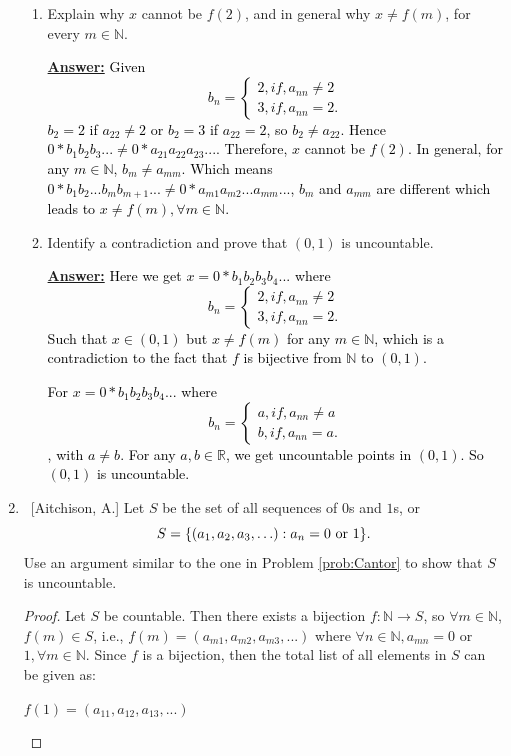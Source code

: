 \documentclass[10pt]{article}
\begin{document}
\begin{enumerate}
\begin{enumerate}
	\item  Explain why $x$ cannot be $f(2)$, and in general why $x \neq f(m)$, for every $m \in \mathbb{N}$.
 
	\textbf{\underline{Answer:}}
 \textcolor{black}{Given
 \begin{equation}
  b_n=%
  \begin{cases}
    2, if,  a_{nn} \neq 2 \\
    3, if,  a_{nn}=2.
  \end{cases}
\end{equation}
$b_2 = 2$ if $a_{22} \neq 2$ or $b_2 = 3$ if $a_{22} = 2$, so $b_2 \neq a_{22}$.  Hence $0*b_1b_2b_3... \neq 0*a_{21}a_{22}a_{23}...$.  Therefore, $x$ cannot be $f(2)$.  In general, for any $m \in \mathbb{N}$, $b_m \neq a_{mm}$.  Which means $0*b_1b_2...b_mb_{m+1}... \neq 0*a_{m1}a_{m2}...a_{mm}...$, $b_m$ and $a_{mm}$ are different which leads to $x \neq f(m), \forall m \in \mathbb{N}$.
}
 
	\item  Identify a contradiction and prove that $(0,1)$ is uncountable.
 
	\textbf{\underline{Answer:}}
 \textcolor{black}{Here we get $x = 0*b_1b_2b_3b_4...$ where 
 \begin{equation}
  b_n=%
  \begin{cases}
    2, if,  a_{nn} \neq 2 \\
    3, if,  a_{nn}=2.
  \end{cases}
\end{equation}
Such that $x \in (0,1)$ but $x \neq f(m)$ for any $m \in \mathbb{N}$, which is a contradiction to the fact that $f$ is bijective from $\mathbb{N}$ to $(0,1)$.
}

\textcolor{black}{For $x = 0*b_1b_2b_3b_4...$ where 
 \begin{equation}
  b_n=%
  \begin{cases}
    a, if,  a_{nn} \neq a \\
    b, if,  a_{nn}=a.
  \end{cases}
\end{equation}
, with $a \neq b$.  For any $a,b \in \mathbb{R}$, we get uncountable points in $(0,1)$.  So $(0,1)$ is uncountable.
}
 
	\end{enumerate}
	
	
\item  ~[Aitchison, A.] Let $S$ be the set of all sequences of $0$s and $1$s, or $$S = \{(a_1, a_2, a_3, \ldots) : a_n = 0 \textnormal{ or } 1 \}.$$  Use an argument similar to the one in Problem \ref{prob:Cantor} to show that $S$ is uncountable.
\begin{proof}
    Let $S$ be countable.  Then there exists a bijection $f: \mathbb{N} \rightarrow S$, so $\forall m \in \mathbb{N}$, $f(m) \in S$, i.e., $f(m) = (a_{m1}, a_{m2}, a_{m3},...)$ where $\forall n \in \mathbb{N}, a_{mn} = 0$ or $1, \forall m \in \mathbb{N}$.  Since $f$ is a bijection, then the total list of all elements in $S$ can be given as:
    \begin{center}
        $f(1) = (a_{11}, a_{12}, a_{13},...)$
        

\end{center}
\end{proof}
\end{enumerate}
\end{document}
